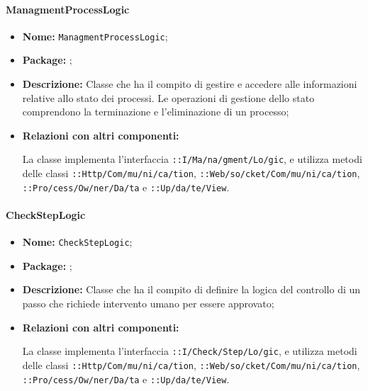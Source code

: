 \paragraph{ManagmentProcessLogic}
\begin{flushleft}
\begin{itemize}
\item \textbf{Nome:} \texttt{ManagmentProcessLogic};
\item \textbf{Package:} \texttt{\logicAdmin{}};
\item \textbf{Descrizione:} Classe che ha il compito di gestire e accedere alle informazioni relative allo stato dei processi. Le operazioni di gestione dello stato comprendono la terminazione e l'eliminazione di un processo;
\item \textbf{Relazioni con altri componenti:}
\begin{sloppypar}
La classe implementa l'interfaccia \texttt{\iLogicAdmin{}::I\fshyp{}Ma\fshyp{}na\fshyp{}gment\fshyp{}Lo\fshyp{}gic}, e utilizza metodi delle classi \texttt{\serverCommunication{}::Http\fshyp{}Com\fshyp{}mu\fshyp{}ni\fshyp{}ca\fshyp{}tion}, \texttt{\serverCommunication{}::Web\fshyp{}so\fshyp{}cket\fshyp{}Com\fshyp{}mu\fshyp{}ni\fshyp{}ca\fshyp{}tion}, \texttt{\modelAdmin{}::Pro\fshyp{}cess\fshyp{}Ow\fshyp{}ner\fshyp{}Da\fshyp{}ta} e \texttt{\logicAdmin{}::Up\fshyp{}da\fshyp{}te\fshyp{}View}.
\end{sloppypar}
\end{itemize}
\end{flushleft}

\paragraph{CheckStepLogic}
\begin{flushleft}
\begin{itemize}
\item \textbf{Nome:} \texttt{CheckStepLogic};
\item \textbf{Package:} \texttt{\logicAdmin{}};
\item \textbf{Descrizione:} Classe che ha il compito di definire la logica del controllo di un passo che richiede intervento umano per essere approvato;
\item \textbf{Relazioni con altri componenti:}
\begin{sloppypar}
La classe implementa l'interfaccia \texttt{\iLogicAdmin{}::I\fshyp{}Check\fshyp{}Step\fshyp{}Lo\fshyp{}gic}, e utilizza metodi delle classi \texttt{\serverCommunication{}::Http\fshyp{}Com\fshyp{}mu\fshyp{}ni\fshyp{}ca\fshyp{}tion}, \texttt{\serverCommunication{}::Web\fshyp{}so\fshyp{}cket\fshyp{}Com\fshyp{}mu\fshyp{}ni\fshyp{}ca\fshyp{}tion}, \texttt{\modelAdmin{}::Pro\fshyp{}cess\fshyp{}Ow\fshyp{}ner\fshyp{}Da\fshyp{}ta} e \texttt{\logicAdmin{}::Up\fshyp{}da\fshyp{}te\fshyp{}View}.
\end{sloppypar}
\end{itemize}
\end{flushleft}

